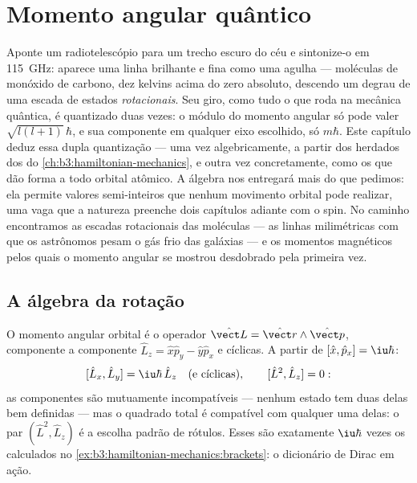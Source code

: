 \chapter{Momento angular quântico}\label{ch:b3:quantum-angular-momentum}

Aponte um radiotelescópio para um trecho escuro do céu e sintonize-o em
\qty{115}{GHz}: aparece uma linha brilhante e fina como uma agulha ---
moléculas de monóxido de carbono, dez kelvins acima do zero absoluto,
descendo um degrau de uma escada de estados \emph{rotacionais}. Seu
giro, como tudo o que roda na mecânica quântica, é quantizado duas
vezes: o módulo do momento angular só pode valer
$\sqrt{l(l+1)}\,\hbar$, e sua componente em qualquer eixo escolhido, só
$m\hbar$. Este capítulo deduz essa dupla quantização --- uma vez
algebricamente, a partir dos  herdados dos  do \cref{ch:b3:hamiltonian-mechanics}, e outra vez
concretamente, como os  que dão forma a todo
orbital atômico. A álgebra nos entregará mais do que pedimos: ela
permite valores semi-inteiros que nenhum movimento orbital pode
realizar, uma vaga que a natureza preenche dois capítulos adiante com o
spin. No caminho encontramos as escadas rotacionais das moléculas ---
as linhas milimétricas com que os astrônomos pesam o gás frio das
galáxias --- e os momentos magnéticos pelos quais o momento angular se
mostrou desdobrado pela primeira vez.

\section{A álgebra da rotação}

\begin{definition}\label{def:b3:quantum-angular-momentum:operators}
O momento angular orbital é o operador $\hat{\vect L} =
\hat{\vect r}\wedge\hat{\vect p}$, componente a componente $\hat L_z = \hat
x\hat p_y - \hat y\hat p_x$ e cíclicas. A partir de $[\hat x, \hat p_x] =
\iu\hbar$:
\[
[\hat L_x, \hat L_y] = \iu\hbar\,\hat L_z
\quad\text{(e cíclicas)} , \qquad
[\hat L^2, \hat L_z] = 0 :
\]
as componentes são mutuamente incompatíveis --- nenhum estado tem duas
delas bem definidas --- mas o quadrado total é compatível com qualquer
uma delas: o par $(\hat L^2, \hat L_z)$ é a escolha padrão de rótulos.
Esses  são exatamente $\iu\hbar$ vezes os  calculados no \cref{ex:b3:hamiltonian-mechanics:brackets}: o
dicionário de Dirac em ação.
\end{definition}

